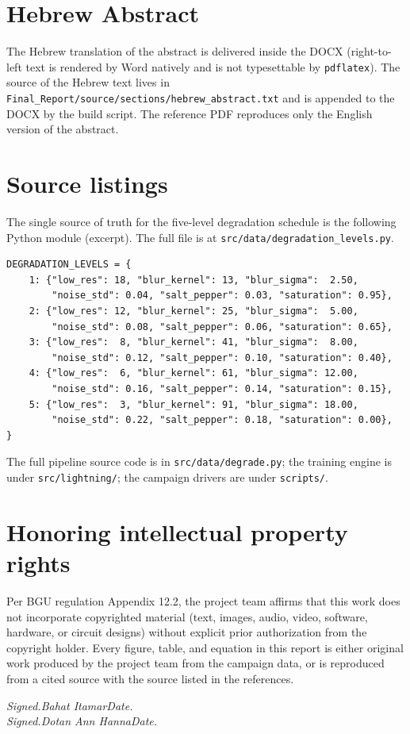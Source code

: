 
\section{Hebrew Abstract}
\label{app:hebrew}

\noindent The Hebrew translation of the abstract is delivered inside the
DOCX (right-to-left text is rendered by Word natively and is not
typesettable by \texttt{pdflatex}). The source of the Hebrew text lives in
\texttt{Final\_Report/source/sections/hebrew\_abstract.txt} and is
appended to the DOCX by the build script. The reference PDF reproduces
only the English version of the abstract.

\section{Source listings}
\label{app:listings}

The single source of truth for the five-level degradation schedule is the
following Python module (excerpt). The full file is at
\texttt{src/data/degradation\_levels.py}.

\begin{small}\begin{verbatim}
DEGRADATION_LEVELS = {
    1: {"low_res": 18, "blur_kernel": 13, "blur_sigma":  2.50,
        "noise_std": 0.04, "salt_pepper": 0.03, "saturation": 0.95},
    2: {"low_res": 12, "blur_kernel": 25, "blur_sigma":  5.00,
        "noise_std": 0.08, "salt_pepper": 0.06, "saturation": 0.65},
    3: {"low_res":  8, "blur_kernel": 41, "blur_sigma":  8.00,
        "noise_std": 0.12, "salt_pepper": 0.10, "saturation": 0.40},
    4: {"low_res":  6, "blur_kernel": 61, "blur_sigma": 12.00,
        "noise_std": 0.16, "salt_pepper": 0.14, "saturation": 0.15},
    5: {"low_res":  3, "blur_kernel": 91, "blur_sigma": 18.00,
        "noise_std": 0.22, "salt_pepper": 0.18, "saturation": 0.00},
}
\end{verbatim}\end{small}

The full pipeline source code is in \texttt{src/data/degrade.py}; the
training engine is under \texttt{src/lightning/}; the campaign drivers are
under \texttt{scripts/}.

\section{Honoring intellectual property rights}
\label{app:ip}

Per BGU regulation Appendix 12.2, the project team affirms that this work
does not incorporate copyrighted material (text, images, audio, video,
software, hardware, or circuit designs) without explicit prior
authorization from the copyright holder. Every figure, table, and
equation in this report is either original work produced by the project
team from the campaign data, or is reproduced from a cited source with
the source listed in the references.

\vspace{1em}
\noindent
\textit{Signed.\quad Bahat Itamar\quad\dotfill\quad Date.\quad\dotfill}\\
\textit{Signed.\quad Dotan Ann Hanna\quad\dotfill\quad Date.\quad\dotfill}
